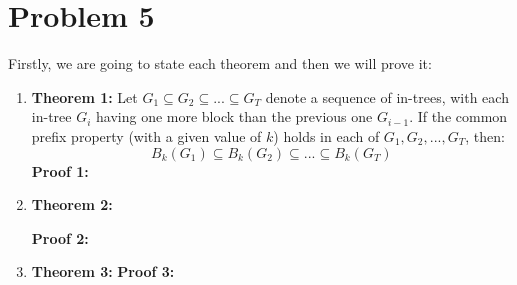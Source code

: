 \documentclass{article}
\begin{document}
\section*{Problem 5}
Firstly, we are going to state each theorem and then we will prove it:\\
\begin{enumerate}
    \item \textbf{Theorem 1:} Let $G_1 \subseteq G_2 \subseteq ... \subseteq G_T $  
    denote a sequence of in-trees, with each in-tree $G_i$ having one more block than the previous one $G_{i-1}$. If the common prefix property (with a given value of $k$) holds in each of $G_1 , G_2 , ..., G_T $, then:
    \begin{equation}
        B_k(G_1) \subseteq B_k(G_2) \subseteq ... \subseteq B_k(G_T)   
    \end{equation}
    \textbf{Proof 1:}
    
    
    \item \textbf{Theorem 2:}
    
    \textbf{Proof 2:}    
    
    \item \textbf{Theorem 3:}
    \textbf{Proof 3:}
    
\end{enumerate}
\end{document}
